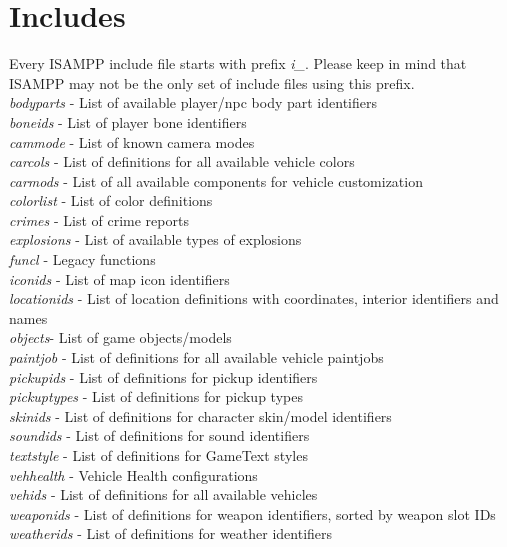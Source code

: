 \documentclass{article}
\begin{document}
\section{Includes}
Every ISAMPP include file starts with prefix \textit{i\_}. Please keep in mind that ISAMPP may not be the only set of include files using this prefix.
\bigskip
\\\textit{bodyparts} - List of available player/npc body part identifiers
\\\textit{boneids} - List of player bone identifiers
\\\textit{cammode} - List of known camera modes
\\\textit{carcols} - List of definitions for all available vehicle colors
\\\textit{carmods} - List of all available components for vehicle customization
\\\textit{colorlist} - List of color definitions
\\\textit{crimes} - List of crime reports
\\\textit{explosions} - List of available types of explosions
\\\textit{funcl} - Legacy functions
\\\textit{iconids} - List of map icon identifiers
\\\textit{locationids} - List of location definitions with coordinates, interior identifiers and names
\\\textit{objects}- List of game objects/models
\\\textit{paintjob} - List of definitions for all available vehicle paintjobs
\\\textit{pickupids} - List of definitions for pickup identifiers
\\\textit{pickuptypes} - List of definitions for pickup types
\\\textit{skinids} - List of definitions for character skin/model identifiers
\\\textit{soundids} - List of definitions for sound identifiers
\\\textit{textstyle} - List of definitions for GameText styles
\\\textit{vehhealth} - Vehicle Health configurations
\\\textit{vehids} - List of definitions for all available vehicles
\\\textit{weaponids} - List of definitions for weapon identifiers, sorted by weapon slot IDs
\\\textit{weatherids} - List of definitions for weather identifiers
\end{document}
